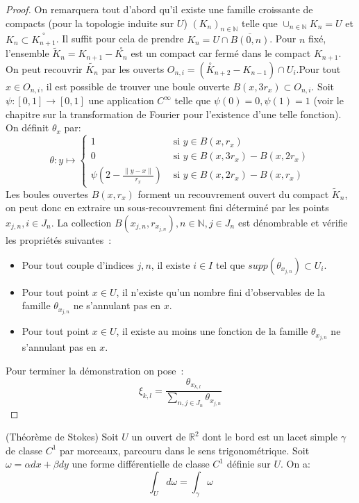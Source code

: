 \begin{proof}
On remarquera tout d'abord qu'il existe une famille croissante de compacts
(pour la topologie induite sur $U$) $(K_n)_{n \in \mathbb{N}}$ telle que
$\cup_{n \in \mathbb{N}} K_n = U$ et $K_n \subset \overset{\circ}{K_{n+1}}$. Il suffit pour cela de prendre $K_n =
U \cap \overline{B(0,n)}$. Pour $n$ fixé, l'ensemble
$\tilde{K}_n = K_{n+1} - \overset{\circ}{K_{n}}$ est un compact car fermé
dans le compact $K_{n+1}$. On peut recouvrir $\tilde{K_n}$ par les ouverts
$O_{n,i} =  (\overset{\circ}{K}_{n+2} - K_{n-1}) \cap U_i$.Pour tout $x \in
O_{n,i}$, il est possible de trouver une boule ouverte $B(x,3r_x) \subset
O_{n,i}$. Soit $\psi \colon [0,1] \to [0,1]$ une application $C^\infty$ telle
que $\psi(0)=0, \psi(1)=1$ (voir le chapitre sur la transformation de Fourier
pour l'existence d'une telle fonction).
On définit $\theta_x$ par:
\[
\theta \colon y \mapsto \left \{
\begin{array}{cc}
1 & \text{ si } y \in B(x,r_x) \\
0 & \text{ si } y \in B(x,3r_x) - B(x,2r_x) \\
\psi\left(2 - \frac{\|y-x\|}{r_x}\right) & \text{ si } y \in B(x,2r_x) -
B(x,r_x)
\end{array}
\right .
\]
 Les boules ouvertes $B(x,r_x)$ forment un recouvrement ouvert du compact $\tilde{K}_n$, 
 on peut donc en extraire un sous-recouvrement fini déterminé par les points $x_{j,n}, i \in J_n$. 
 La collection $B(x_{j,n}, r_{x_{j,n}}), n \in
\mathbb{N}, j \in  J_n$ est dénombrable et vérifie les propriétés suivantes~:
\begin{itemize}
  \item Pour tout couple d'indices ${j,n}$, il existe $i \in I$ tel que
  $supp(\theta_{x_{j,n}}) \subset U_i$.
  \item Pour tout point $x \in U$, il n'existe qu'un nombre fini d'observables
  de la famille $\theta_{x_{j,n}}$ ne s'annulant pas en $x$.
  \item Pour tout point $x \in U$, il existe au moins une fonction
  de la famille $\theta_{x_{j,n}}$ ne s'annulant pas en $x$. 
\end{itemize}
Pour terminer la démonstration on pose~:
\[
\xi_{k,l} = \frac{\theta_{x_{k,l}}}{\sum_{n,j\in J_n} \theta_{x_{j,n}}} 
\]
\end{proof}

\begin{fthm}{(Théorème de Stokes)}
Soit $U$ un ouvert de $\mathbb{R}^2$ dont le bord est un lacet simple $\gamma$
de classe $C^1$ par morceaux, parcouru dans le sens trigonométrique. Soit $\omega=\alpha dx + \beta dy$ une forme différentielle
de classe $C^1$ définie sur $U$. On a: 
\[
\int_{U} d \omega = \int_{\gamma} \omega
\]
\end{fthm}

